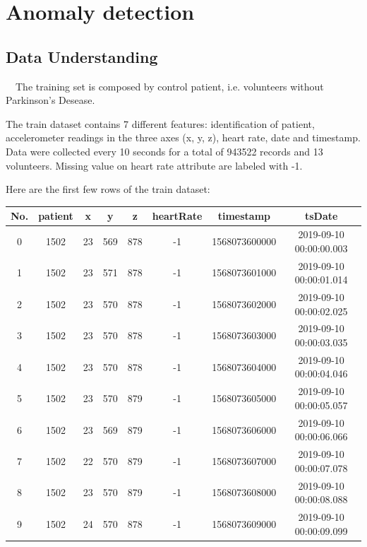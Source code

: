 \chapter*{Anomaly detection}

\section*{Data Understanding}\label{Data Understanding}

~~The training set is composed by control patient, i.e. volunteers without Parkinson’s Desease. 

The train dataset contains 7 different features: identification of patient, accelerometer readings in the three axes (x, y, z), heart rate, date and timestamp. Data were collected every 10 seconds for a total of 943522 records and 13 volunteers. Missing value on heart rate attribute are labeled with -1.

Here are the first few rows of the train dataset:

\begin{center}
\begin{tabular}{| c | c | c | c | c | c | c | c |} 
\hline
No. & patient & x & y & z & heartRate & timestamp & tsDate \\ [0.5ex] 
\hline
\hline
0 &	1502 &	23 &	569 &	878 &	-1 &	1568073600000 &	2019-09-10 00:00:00.003 \\
\hline
1 &	1502 &	23 &	571 &	878 &	-1 &	1568073601000 &	2019-09-10 00:00:01.014 \\
\hline
2 &	1502 &	23 &	570 &	878 &	-1 &	1568073602000 &	2019-09-10 00:00:02.025 \\
\hline
3 &	1502 &	23 &	570 &	878 &	-1 &	1568073603000 &	2019-09-10 00:00:03.035 \\
\hline
4 &	1502 &	23 &	570 &	878 &	-1 &	1568073604000 &	2019-09-10 00:00:04.046 \\
\hline
5 &	1502 &	23 &	570 &	879 &	-1 &	1568073605000 &	2019-09-10 00:00:05.057 \\
\hline
6 &	1502 &	23 &	569 &	879 &	-1 &	1568073606000 &	2019-09-10 00:00:06.066 \\
\hline
7 &	1502 &	22 &	570 &	879 &	-1 &	1568073607000 &	2019-09-10 00:00:07.078 \\
\hline
8 &	1502 &	23 &	570 &	879 &	-1 &	1568073608000 &	2019-09-10 00:00:08.088 \\
\hline
9 &	1502 &	24 &	570 &	878 &	-1 &	1568073609000 &	2019-09-10 00:00:09.099 \\ [1ex] 
\hline
\end{tabular}
\end{center}

